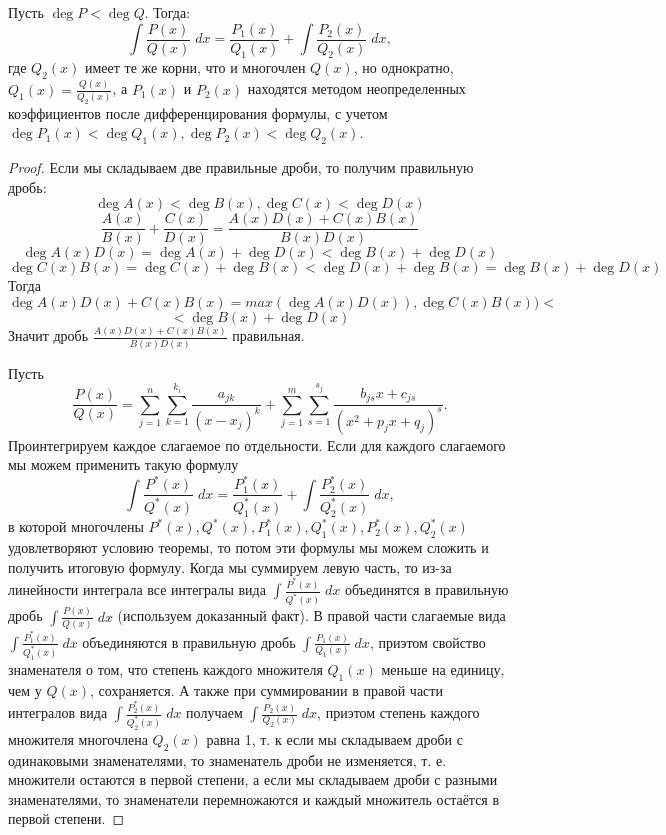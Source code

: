 	\begin{theorem}
		Пусть $\deg{P} < \deg{Q}$. Тогда:
		\[ \int \frac{P(x)}{Q(x)} \; dx = \frac{P_1(x)}{Q_1(x)} + \int \frac{P_2(x)}{Q_2(x)} \; dx,\]
		где $Q_2(x)$ имеет те же корни, что и многочлен $Q(x)$, но
		однократно, $Q_1(x) = \frac{Q(x)}{Q_2(x)}$, а $P_1(x)$ и $P_2(x)$ находятся методом неопределенных коэффициентов после дифференцирования формулы, с учетом $\deg{P_1(x)} < \deg{Q_1(x)}, \deg{P_2(x)} < \deg{Q_2(x)}$.
	\end{theorem}
	
	\begin{proof}
		Если мы складываем две правильные дроби, то получим правильную дробь:
		\[ \deg{A(x)} < \deg{B(x)}, \deg{C(x)} < \deg{D(x)} \]
		\[ \frac{A(x)}{B(x)} + \frac{C(x)}{D(x)} = \frac{A(x)D(x) + C(x)B(x)}{B(x)D(x)} \]
		\[ \deg{A(x)D(x)} = \deg{A(x)} + \deg{D(x)} < \deg{B(x)} + \deg{D(x)} \]
		\[ \deg{C(x)B(x)} = \deg{C(x)} + \deg{B(x)} < \deg{D(x)} + \deg{B(x)} = \deg{B(x)} + \deg{D(x)} \]
		Тогда
		\[ \deg{A(x)D(x) + C(x)B(x)} = max(\deg{A(x)D(x)}), \deg{C(x)B(x)}) < \]
		\[ < \deg{B(x)} + \deg{D(x)} \]
		Значит дробь $\frac{A(x)D(x) + C(x)B(x)}{B(x)D(x)}$ правильная.
		
		Пусть
		\[\frac{P(x)}{Q(x)} = \sum_{j = 1}^{n} \sum_{k = 1}^{k_i} \frac{a_{jk}}{(x - x_j)^k} + \sum_{j = 1}^{m} \sum_{s = 1}^{s_j} \frac{b_{js}x + c_{js}}{(x^2 + p_jx + q_j)^{s}}.\]
		Проинтегрируем каждое слагаемое по отдельности. Если для каждого слагаемого мы можем применить такую формулу
		\[ \int \frac{P^*(x)}{Q^*(x)} \; dx = \frac{P^*_1(x)}{Q^*_1(x)} + \int \frac{P^*_2(x)}{Q^*_2(x)} \; dx,\] в которой многочлены $P^*(x), Q^*(x), P^*_1(x), Q^*_1(x), P^*_2(x), Q^*_2(x)$ удовлетворяют условию теоремы, то потом эти формулы мы можем сложить и получить итоговую формулу. Когда мы суммируем левую часть, то из-за линейности интеграла все интегралы вида $\displaystyle\int \frac{P^*(x)}{Q^*(x)} \; dx$ объединятся в правильную дробь $\displaystyle\int \frac{P(x)}{Q(x)} \; dx$ (используем доказанный факт). В правой части слагаемые вида $\displaystyle\int \frac{P^*_1(x)}{Q^*_1(x)} \; dx$ объединяются в правильную дробь $\displaystyle\int \frac{P_1(x)}{Q_1(x)} \; dx$, приэтом свойство знаменателя о том, что степень каждого множителя $Q_1(x)$ меньше на единицу, чем у $Q(x)$, сохраняется. А также при суммировании в правой части интегралов вида $\displaystyle\int \frac{P^*_2(x)}{Q^*_2(x)} \; dx$ получаем $\displaystyle\int \frac{P_2(x)}{Q_2(x)} \; dx$, приэтом степень каждого множителя многочлена $Q_2(x)$ равна 1, т. к если мы складываем дроби с одинаковыми знаменателями, то знаменатель дроби не изменяется, т. е. множители остаются в первой степени, а если мы складываем дроби с разными знаменателями, то знаменатели перемножаются и каждый множитель остаётся в первой степени.
		

\end{proof}
